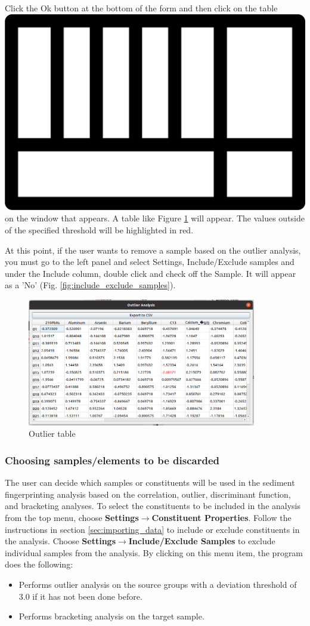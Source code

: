 \documentclass[12pt]{report}
\begin{document}
Click the Ok button at the bottom of the form and then click on the table \includegraphics[width=0.5 cm]{Figures/table.png} on the window that appears. A table like Figure \ref{fig:outlier_table} will appear. The values outside of the specified threshold will be highlighted in red. 

At this point, if the user wants to remove a sample based on the outlier analysis, you must go to the left panel and select Settings, Include/Exclude samples and under the Include column, double click and check off the Sample.  It will appear as a 'No' (Fig. \ref{fig:include_exclude_samples}).

\begin{figure}[ht]
    \centering
    \includegraphics[width=10cm]{Figures/Outlier_table.png}
    \caption{Outlier table}
    \label{fig:outlier_table}
\end{figure}

\subsubsection{Choosing samples/elements to be discarded}
The user can decide which samples or constituents will be used in the sediment fingerprinting analysis based on the correlation, outlier, discriminant function, and bracketing analyses. To select the constituents to be included in the analysis from the top menu, choose \textbf{Settings}$\rightarrow$\textbf{Constituent Properties}. Follow the instructions in section \ref{sec:importing_data} to include or exclude constituents in the analysis. 
Choose \textbf{Settings}$\rightarrow$\textbf{Include/Exclude Samples} to exclude individual samples from the analysis. By clicking on this menu item, the program does the following: 

\begin{itemize}
    \item Performs outlier analysis on the source groups with a deviation threshold of 3.0 if it has not been done before. 
    \item Performs bracketing analysis on the target sample.
\end{itemize}
\end{document}
